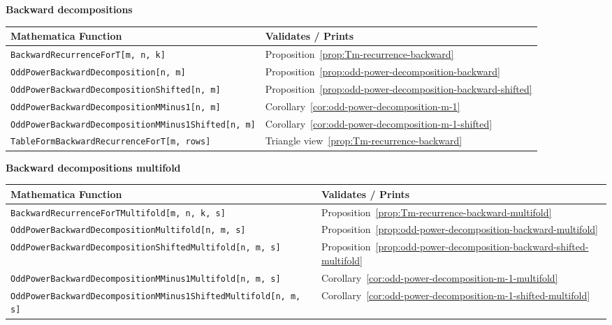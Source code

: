 \clearpage

\textbf{Backward decompositions}
\begin{center}
    \renewcommand{\arraystretch}{1.3}
    \begin{tabular}{ll}
        \toprule
        \textbf{Mathematica Function}                              & \textbf{Validates / Prints}                                     \\
        \midrule
        \texttt{BackwardRecurrenceForT[m, n, k]}                   & Proposition~\ref{prop:Tm-recurrence-backward}                   \\
        \texttt{OddPowerBackwardDecomposition[n, m]}               & Proposition~\ref{prop:odd-power-decomposition-backward}         \\
        \texttt{OddPowerBackwardDecompositionShifted[n, m]}        & Proposition~\ref{prop:odd-power-decomposition-backward-shifted} \\
        \texttt{OddPowerBackwardDecompositionMMinus1[n, m]}        & Corollary~\ref{cor:odd-power-decomposition-m-1}                 \\
        \texttt{OddPowerBackwardDecompositionMMinus1Shifted[n, m]} & Corollary~\ref{cor:odd-power-decomposition-m-1-shifted}         \\
        \texttt{TableFormBackwardRecurrenceForT[m, rows]}          & Triangle view~\ref{prop:Tm-recurrence-backward}                 \\
        \bottomrule
    \end{tabular}
\end{center}

\clearpage

\textbf{Backward decompositions multifold}
\begin{center}
    \renewcommand{\arraystretch}{1.3}
    \begin{tabular}{ll}
        \toprule
        \textbf{Mathematica Function}                                          & \textbf{Validates / Prints}                                               \\
        \midrule
        \texttt{BackwardRecurrenceForTMultifold[m, n, k, s]}                   & Proposition~\ref{prop:Tm-recurrence-backward-multifold}                   \\
        \texttt{OddPowerBackwardDecompositionMultifold[n, m, s]}               & Proposition~\ref{prop:odd-power-decomposition-backward-multifold}         \\
        \texttt{OddPowerBackwardDecompositionShiftedMultifold[n, m, s]}        & Proposition~\ref{prop:odd-power-decomposition-backward-shifted-multifold} \\
        \texttt{OddPowerBackwardDecompositionMMinus1Multifold[n, m, s]}        & Corollary~\ref{cor:odd-power-decomposition-m-1-multifold}                 \\
        \texttt{OddPowerBackwardDecompositionMMinus1ShiftedMultifold[n, m, s]} & Corollary~\ref{cor:odd-power-decomposition-m-1-shifted-multifold}         \\
        \bottomrule
    \end{tabular}
\end{center}

